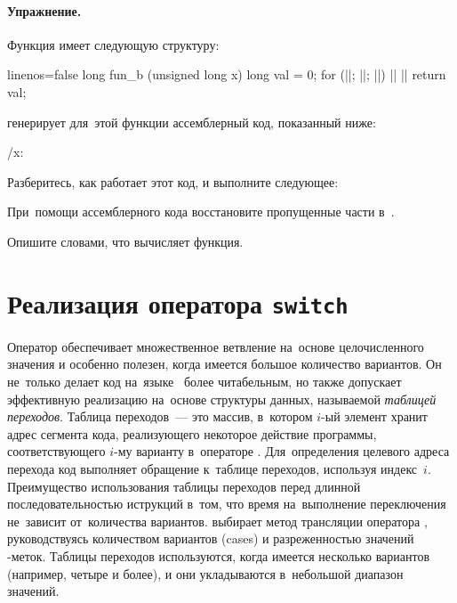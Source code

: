\paragraph{Упражнение.}
Функция  имеет следующую структуру:

{\newcommand*{\ans}{\ansdots}%
%
\begin{ccode*}{linenos=false}
long fun_b (unsigned long x)
{
  long val = 0;
  for (|\ans{long i = 64}|; |\ans{i != 0}|; |\ans{--i}|)
  {
    |\ans{val = (val << 1) \textbar (x \& 0x1);}|
    ||
  }
  return val;
}
\end{ccode*}
}

\noindent \GCC{} генерирует для~этой функции ассемблерный код, показанный ниже:

\precomment/x: %
\vspace{-1.7\baselineskip}

\noindent Разберитесь, как работает этот код, и выполните следующее:
\begin{enumIssue}
\item При~помощи ассемблерного кода восстановите пропущенные части в~.
\item Опишите словами, что вычисляет функция.
\end{enumIssue}



\section{Реализация оператора \texttt{switch}}
Оператор  обеспечивает множественное ветвление на~основе целочисленного значения и особенно полезен, когда имеется большое количество вариантов. Он не~только делает код на~языке~ более читабельным, но также допускает эффективную реализацию на~основе структуры данных, называемой \emph{таблицей переходов}. Таблица переходов~--- это массив, в~котором $i$-ый элемент хранит адрес сегмента кода, реализующего некоторое действие программы, соответствующего $i$-му варианту в~операторе . Для~определения целевого адреса перехода код выполняет обращение к~таблице переходов, используя индекс~$i$. Преимущество использования таблицы переходов перед длинной последовательностью иструкций  в~том, что время на~выполнение переключения не~зависит от~количества вариантов. \GCC{} выбирает метод трансляции оператора , руководствуясь количеством вариантов (\textenglish{cases}) и разреженностью значений -меток. Таблицы переходов используются, когда имеется несколько вариантов (например, четыре и более), и они укладываются в~небольшой диапазон значений.



